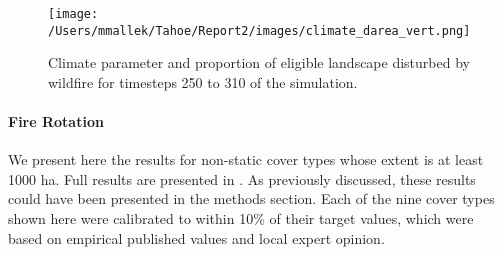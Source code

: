 \begin{figure}[!htbp]
\centering
\texttt{[image: /Users/mmallek/Tahoe/Report2/images/climate\_darea\_vert.png]}
\caption{Climate parameter and proportion of eligible landscape disturbed by wildfire for timesteps 250 to 310 of the simulation.}
\label{fig:compare_clim_darea}
\end{figure}


\newpage
\paragraph{Fire Rotation}
We present here the results for non-static cover types whose extent is at least 1000 ha. Full results are presented in . As previously discussed, these results could have been presented in the methods section. Each of the nine cover types shown here were calibrated to within 10\% of their target values, which were based on empirical published values and local expert opinion.

